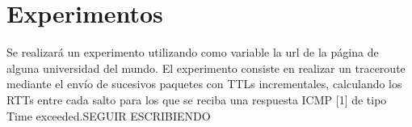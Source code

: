 \section{Experimentos}

Se realizará un experimento utilizando como variable la url de la página de alguna universidad del mundo. El experimento consiste en realizar un traceroute mediante el envío de sucesivos paquetes con TTLs incrementales, calculando los RTTs entre cada salto para los que se reciba una respuesta ICMP [1] de tipo Time exceeded.SEGUIR ESCRIBIENDO